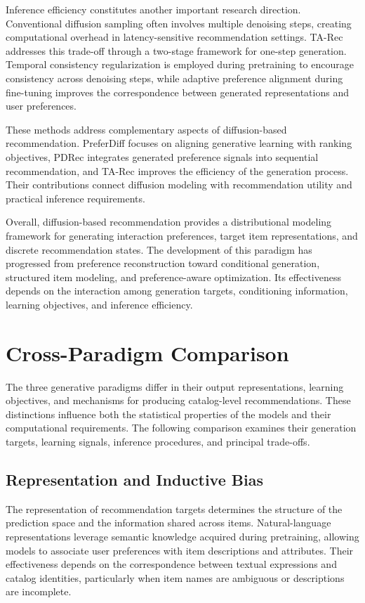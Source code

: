 \documentclass[sigconf,nonacm]{acmart}
\begin{document}
Inference efficiency constitutes another
important research direction. Conventional
diffusion sampling often involves multiple
denoising steps, creating computational
overhead in latency-sensitive recommendation
settings. TA-Rec~\cite{tarec} addresses this
trade-off through a two-stage framework
for one-step generation. Temporal consistency
regularization is employed during pretraining
to encourage consistency across denoising
steps, while adaptive preference alignment
during fine-tuning improves the correspondence
between generated representations and user
preferences.

These methods address complementary aspects
of diffusion-based recommendation.
PreferDiff focuses on aligning generative
learning with ranking objectives, PDRec
integrates generated preference signals
into sequential recommendation, and TA-Rec
improves the efficiency of the generation
process. Their contributions connect
diffusion modeling with recommendation
utility and practical inference requirements.

Overall, diffusion-based recommendation
provides a distributional modeling
framework for generating interaction
preferences, target item representations,
and discrete recommendation states.
The development of this paradigm has
progressed from preference reconstruction
toward conditional generation, structured
item modeling, and preference-aware
optimization. Its effectiveness depends
on the interaction among generation
targets, conditioning information,
learning objectives, and inference
efficiency.


\section{Cross-Paradigm Comparison}
\label{sec:comparison}

The three generative paradigms differ in their output
representations, learning objectives, and mechanisms for
producing catalog-level recommendations. These distinctions
influence both the statistical properties of the models
and their computational requirements. The following comparison
examines their generation targets, learning signals, inference
procedures, and principal trade-offs.


\subsection{Representation and Inductive Bias}

The representation of recommendation targets determines
the structure of the prediction space and the information
shared across items. Natural-language representations
leverage semantic knowledge acquired during pretraining,
allowing models to associate user preferences with item
descriptions and attributes. Their effectiveness depends
on the correspondence between textual expressions and
catalog identities, particularly when item names are
ambiguous or descriptions are incomplete.
\end{document}

